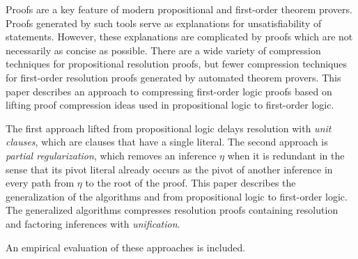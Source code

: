 Proofs are a key feature of modern propositional and first-order theorem provers. 
Proofs generated by such tools serve as explanations for unsatisfiability of statements. 
However, these explanations are complicated by proofs which are not necessarily as concise as possible.
There are a wide variety of compression techniques for propositional resolution proofs, but fewer compression techniques for first-order resolution proofs generated by automated theorem provers.
This paper describes an approach to compressing first-order logic proofs based on lifting proof compression ideas used in propositional logic to first-order logic. 

The first approach lifted from propositional logic delays resolution with \emph{unit clauses}, which are clauses that have a single literal.
The second approach is \emph{partial regularization}, which removes an inference $\eta$ when it is redundant in the sense that its pivot literal already occurs as the pivot of another inference in every path from $\eta$ to the root of the proof. 
This paper describes the generalization of the algorithms \LowerUnits and  from propositional logic to first-order logic. 
The generalized algorithms compresses resolution proofs containing resolution and factoring inferences with \emph{unification}.

An empirical evaluation of these approaches is included.


